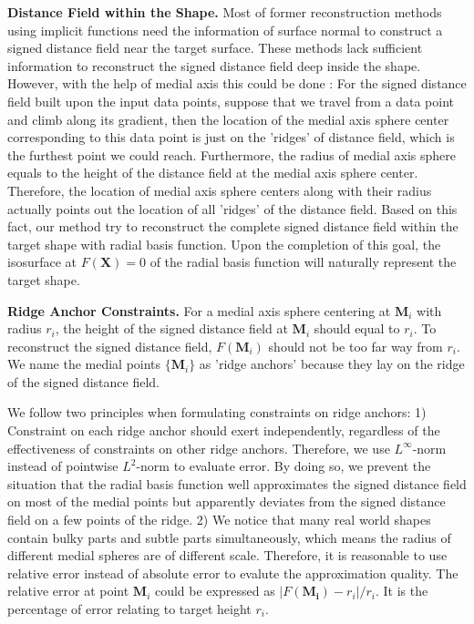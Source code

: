\documentclass[review]{acmsiggraph}
\begin{document}
\textbf{Distance Field within the Shape. }
Most of former reconstruction methods using implicit functions need the information of surface normal to construct a signed distance field near the target surface. These methods lack sufficient information to reconstruct the signed distance field deep inside the shape. However, with the help of medial axis this could be done : For the signed distance field built upon the input data points, suppose that we travel from a data point and climb along its gradient, then the location of the medial axis sphere center corresponding to this data point is just on the 'ridges' of distance field, which is the furthest point we could reach. Furthermore, the radius of medial axis sphere equals to the height of the distance field at the medial axis sphere center. Therefore, the location of medial axis sphere centers along with their radius actually points out the location of all 'ridges' of the distance field. Based on this fact, our method try to reconstruct the complete signed distance field within the target shape with radial basis function. Upon the completion of this goal, the isosurface at $F(\mathbf{X})=0$ of the radial basis function will naturally represent the target shape.

\textbf{Ridge Anchor Constraints. }
For a medial axis sphere centering at $\mathbf{M}_i$ with radius $r_i$, the height of the signed distance field at $\mathbf{M}_i$ should equal to $r_i$. To reconstruct the signed distance field, $F(\mathbf{M}_i)$ should not be too far way from $r_i$. We name the medial points $\{\mathbf{M}_i\}$ as 'ridge anchors' because they lay on the ridge of the signed distance field. 

We follow two principles when formulating constraints on ridge anchors: 1) Constraint on each ridge anchor should exert independently, regardless of the effectiveness of constraints on other ridge anchors. Therefore, we use $L^{\infty}$-norm instead of pointwise $L^2$-norm to evaluate error. By doing so, we prevent the situation that the radial basis function well approximates the signed distance field on most of the medial points but apparently deviates from the signed distance field on a few points of the ridge. 2) We notice that many real world shapes contain bulky parts and subtle parts simultaneously, which means the radius of different medial spheres are of different scale. Therefore, it is reasonable to use relative error instead of absolute error to evalute the approximation quality. The relative error at point $\mathbf{M}_i$ could be expressed as $|F(\mathbf{M_i})-r_i|/r_i$. It is the percentage of error relating to target height $r_i$.
\end{document}
